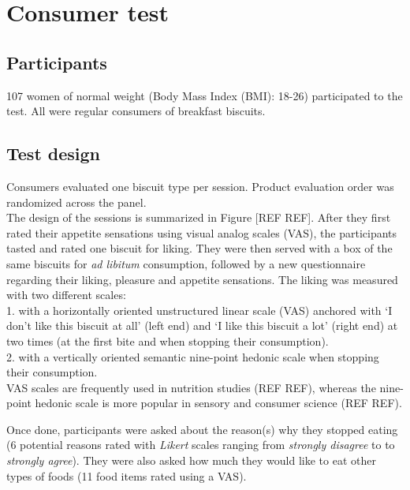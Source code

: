 \documentclass[
]{book}
\begin{document}
\hypertarget{consumer-test}{%
\section{Consumer test}\label{consumer-test}}

\hypertarget{participants}{%
\subsection{Participants}\label{participants}}

107 women of normal weight (Body Mass Index (BMI): 18-26) participated to the test. All were regular consumers of breakfast biscuits.

\hypertarget{test-design}{%
\subsection{Test design}\label{test-design}}

Consumers evaluated one biscuit type per session. Product evaluation order was randomized across the panel.\\
The design of the sessions is summarized in Figure {[}REF REF{]}. After they first rated their appetite sensations using visual analog scales (VAS), the participants tasted and rated one biscuit for liking. They were then served with a box of the same biscuits for \emph{ad libitum} consumption, followed by a new questionnaire regarding their liking, pleasure and appetite sensations.
The liking was measured with two different scales:\\
1. with a horizontally oriented unstructured linear scale (VAS) anchored with `I don't like this biscuit at all' (left end) and `I like this biscuit a lot' (right end) at two times (at the first bite and when stopping their consumption).\\
2. with a vertically oriented semantic nine-point hedonic scale when stopping their consumption.\\
VAS scales are frequently used in nutrition studies (REF REF), whereas the nine-point hedonic scale is more popular in sensory and consumer science (REF REF).

Once done, participants were asked about the reason(s) why they stopped eating (6 potential reasons rated with \emph{Likert} scales ranging from \emph{strongly disagree} to to \emph{strongly agree}). They were also asked how much they would like to eat other types of foods (11 food items rated using a VAS).
\end{document}
